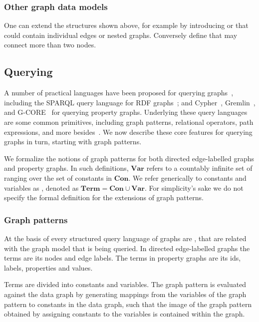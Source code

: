 \subsubsection{Other graph data models}
One can extend the structures shown above, for example by introducing   or  that could contain individual edges or nested graphs. Conversely  define  that may connect more than two nodes.

\subsection{Querying}
A number of practical languages have been proposed for querying graphs~\cite{Angles2017FoundationmodernQueryLnguagesforGraphDatabases}, including the SPARQL query language for RDF graphs~\cite{Harris2013SPARQL}; and Cypher~\cite{Francis2018Cypher}, Gremlin~\cite{Rodriguez2015Gremlin}, and G-CORE~\cite{Angles2018G-CORE} for querying property graphs. Underlying these query languages are some common primitives, including graph patterns, relational operators, path expressions, and more besides~\cite{Angles2017FoundationmodernQueryLnguagesforGraphDatabases}. We now describe these core features for querying graphs in turn, starting with graph patterns. 

\medskip
We formalize the notions of graph patterns for both directed edge-labelled graphs and property graphs. In such definitions, $\textbf{Var}$ refers to a countably infinite set of  ranging over the set of constants in $\textbf{Con}$. We refer generically to constants and variables as , denoted as $\textbf{Term} = \textbf{Con} \cup \textbf{Var}$. For simplicity's sake we do not specify the formal definition for the extensions of graph patterns.

\subsubsection{Graph patterns}
At the basis of every structured query language of graphs are , that are related with the graph model that is being queried. In directed edge-labelled graphs the terms are its nodes and edge labels. The terms in property graphs are its ids, labels, properties and values.

Terms are divided into constants and variables. The graph pattern is evaluated against the data graph by generating mappings from the variables of the graph pattern to constants in the data graph, such that the image of the graph pattern obtained by assigning constants to the variables is contained within the graph. 


